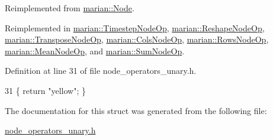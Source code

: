 Reimplemented from \hyperlink{classmarian_1_1Node_a19cfc4e99a01cb4a3fe1b20dce3b7db2}{marian\+::\+Node}.



Reimplemented in \hyperlink{classmarian_1_1TimestepNodeOp_a2beedbe285b4c1f5b5528d0d2f406ae1}{marian\+::\+Timestep\+Node\+Op}, \hyperlink{classmarian_1_1ReshapeNodeOp_af2273386eb99822cd20bce1b9e877f49}{marian\+::\+Reshape\+Node\+Op}, \hyperlink{structmarian_1_1TransposeNodeOp_a207e692b92be4e144ace62033039b1cc}{marian\+::\+Transpose\+Node\+Op}, \hyperlink{structmarian_1_1ColsNodeOp_a7a05f997b241c0f524c125e111096218}{marian\+::\+Cols\+Node\+Op}, \hyperlink{structmarian_1_1RowsNodeOp_ab00d9d52a8dc80de0655d1cab56a8718}{marian\+::\+Rows\+Node\+Op}, \hyperlink{structmarian_1_1MeanNodeOp_a695658ac77c947c09a49e8520f8879b3}{marian\+::\+Mean\+Node\+Op}, and \hyperlink{structmarian_1_1SumNodeOp_ae2985b156380c467fa272cc38233074a}{marian\+::\+Sum\+Node\+Op}.



Definition at line 31 of file node\+\_\+operators\+\_\+unary.\+h.


\begin{DoxyCode}
31 \{ \textcolor{keywordflow}{return} \textcolor{stringliteral}{"yellow"}; \}
\end{DoxyCode}


The documentation for this struct was generated from the following file\+:\begin{DoxyCompactItemize}
\item 
\hyperlink{node__operators__unary_8h}{node\+\_\+operators\+\_\+unary.\+h}\end{DoxyCompactItemize}
